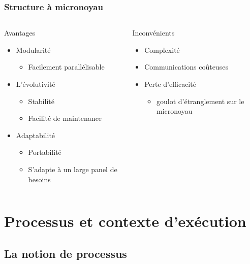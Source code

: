 \begin{frame}
\frametitle{Structure à micronoyau}
\begin{columns}
\begin{block}{Avantages}
\begin{itemize}
\item Modularité
\begin{itemize}
\item Facilement parallélisable
\end{itemize}
\item L'évolutivité
\begin{itemize}
\item Stabilité
\item Facilité de maintenance
\end{itemize}
\item Adaptabilité
\begin{itemize}
\item Portabilité
\item S'adapte à un large panel de besoins
\end{itemize}
\end{itemize}
\end{block}
\begin{block}{Inconvénients}
\begin{itemize}
\item Complexité
\item Communications coûteuses
\item Perte d'efficacité
\begin{itemize}
\item goulot d'étranglement sur le micronoyau
\end{itemize}
\end{itemize}
\end{block}
\end{columns}
\end{frame}



\section{Processus et contexte d'exécution}
\subsection{La notion de processus}

